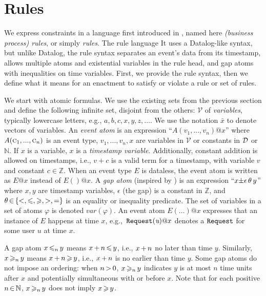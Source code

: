 \section{Rules}
\label{rule-language}

We express constraints in a language first introduced in \cite{mackey2022rule},
named here {\em (business process) rules},
or simply {\em rules}.
The rule language
It uses a Datalog-like syntax,
but unlike Datalog,
the rule syntax separates an event's data from its timestamp,
allows multiple atoms and existential variables in the rule head,
and gap atoms with inequalities on time variables.
First, we provide the rule syntax,
then we define what it means for an enactment
to satisfy or violate a rule or set of rules.

We start with atomic formulas.
We use the existing sets from the previous section
and define the following infinite set,
disjoint from the others:
$\mathcal{V}$ of {\em variables},
typically lowercase letters, 
e.g., $a, b, c, x, y, z, \dots$. 
We use the notation $\bar{x}$ to denote vectors of variables.
An {\em event atom}
is an expression ``$A(v_1,...,v_n)@x$''
where $A(\textsc{c}_1,...,\textsc{c}_n)$ is an event type,
$v_1,...,v_n,x$ are variables in $\mathcal{V}$
or constants in $\mathcal{D}$ or $\mathbb{N}$.
If $x$ is a variable,
$x$ is a {\it timestamp variable}.
Additionally, constant addition is allowed on timestamps,
i.e., $v+c$ is a valid term for a timestamp,
with variable $v$ and constant $c\in\mathbb{Z}$.
When an event type $E$ is dataless,
the event atom is written as $E@x$ instead of $E()@x$.
A {\em gap atom} (inspired by \cite{Re93}) is
an expression ``$x{\pm}\epsilon \,{\theta}\, y$''
where $x,y$ are timestamp variables,
$\epsilon$ (the gap) is a constant in $\mathbb{Z}$,
and
$\theta\,{\in}\,\{<,\leqslant,\allowbreak\geqslant,>,=\}$
is an equality or inequality predicate.
The set of variables in a set of atoms $\varphi$
is denoted $var(\varphi)$.
An event atom $E(\dots)@x$ expresses
that an instance of $E$ happens at time $x$,
e.g.,\ $\texttt{Request}(\mbox{\em u})@x$ denotes a $\texttt{Request}$
for some user $u$ at time $x$.

A gap atom $x \,{\leqslant_n}\, y$ means $x \,{+}\, n \,{\leqslant}\, y$,
i.e., $x\,{+}\,n$ no later than time $y$.
Similarly,
$x \,{\geqslant_n}\, y$ means $x \,{+}\, n \,{\geqslant}\, y$,
i.e., $x\,{+}\,n$ is no earlier than time $y$.
Some gap atoms do not impose an ordering:
when $n\,{>}\,0$, $x \,{\geqslant_n}\, y$ indicates
$y$ is at most $n$ time units after $x$ and potentially
simultaneous with or before $x$.
Note that for each positive $n\,{\in}\,\mathbb{N}$,
$x \,{\geqslant_n}\, y$ does not imply $x \,{\geqslant}\, y$.

